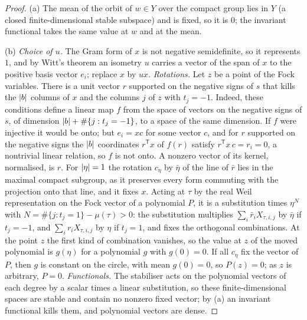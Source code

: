 \begin{proof}
(a) The mean of the orbit of $w\in Y$ over the compact group lies in $Y$ (a closed finite-dimensional stable subspace) and is fixed, so it is $0$; the invariant functional takes the same value at $w$ and at the
mean.

(b) \emph{Choice of $u$.} The Gram form of $x$ is not negative semidefinite, so it represents $1$, and by Witt's theorem an isometry $u$ carries a vector of the span of $x$ to the positive basis vector $e_i$;
replace $x$ by $ux$. \emph{Rotations.} Let $z$ be a point of the Fock variables. There is a unit vector $r$ supported on the negative signs of $s$ that kills the $\lvert b\rvert$ columns of $x$ and the columns $j$ of $z$ with $t_j=-1$.
Indeed, these conditions define a linear map $f$ from the space of vectors on the negative signs of $s$, of dimension $\lvert b\rvert+\#\{j:t_j=-1\}$, to a space of the same dimension. If $f$ were injective it
would be onto; but $e_i=xc$ for some vector $c$, and for $r$ supported on the negative signs the $\lvert b\rvert$ coordinates $r^{\mathsf T}x$ of $f(r)$ satisfy $r^{\mathsf T}x\,c=r_i=0$, a nontrivial linear relation, so $f$ is
not onto. A nonzero vector of its kernel, normalised, is $r$. For $\lvert \eta\rvert=1$ the rotation $c_\eta$ by $\bar\eta$ of the line of $\bar r$ lies in
the maximal compact subgroup, as it preserves every form commuting with the projection onto that line, and it fixes $x$. Acting at $\tau$ by the real Weil representation on the Fock vector of a polynomial
$P$, it is a substitution times $\eta^N$ with $N=\#\{j:t_j=1\}-\mu(\tau)>0$: the substitution multiplies $\sum_i\bar r_iX_{\tau,i,j}$ by $\bar\eta$ if $t_j=-1$, and $\sum_ir_iX_{\tau,i,j}$ by $\eta$ if $t_j=1$, and fixes the
orthogonal combinations. At the point $z$ the first kind of combination vanishes, so the value at $z$ of the moved polynomial is $g(\eta)$ for a polynomial $g$ with $g(0)=0$. If all $c_\eta$ fix the vector of $P$,
then $g$ is constant on the circle, with mean $g(0)=0$, so $P(z)=0$; as $z$ is arbitrary, $P=0$. \emph{Functionals.} The stabiliser acts on the polynomial vectors of each degree by a scalar times a linear
substitution, so these finite-dimensional spaces are stable and contain no nonzero fixed vector; by (a) an invariant functional kills them, and polynomial vectors are dense.


\end{proof}
